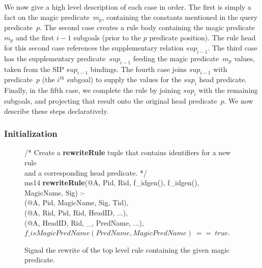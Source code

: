 
We now give a high level description of each case in order.  The first is
simply a fact on the magic predicate~$m_p$, containing the constants mentioned
in the query predicate~$p$.  The second case creates a rule body containing the
magic predicate~$m_p$ and the first $i-1$ subgoals (prior to the $p$ predicate
position).  The rule head for this second case references the supplementary
relation $sup_{i-1}$.  The third case has the supplementary
predicate~$sup_{i-1}$ feeding the magic predicate~$m_p$ values, taken from the
SIP $sup_{i-1}$ bindings.  The fourth case joins $sup_{i-1}$ with predicate~$p$
(the $i^{th}$ subgoal) to supply the values for the $sup_i$ head predicate.
Finally, in the fifth case, we complete the rule by joining $sup_i$ with the
remaining subgoals, and projecting that result onto the original head
predicate~$p$.  We now describe these steps declaratively.

\subsubsection{Initialization}

\begin{figure}[!t]
\ssp
\centering
\begin{boxedminipage}{\linewidth}
/* Create a {\bf rewriteRule} tuple that contains identifiers for a new rule \\
and a corresponding head predicate. */ \\
ms14 {\bf rewriteRule}(@A, Pid, Rid, f\_idgen(), f\_idgen(), MagicName, Sig) :- \\
(@A, Pid, MagicName, Sig, Tid), \\
(@A, Rid, Pid, Rid, HeadID, ...), \\
(@A, HeadID, Rid, \_, PredName, ...), \\
\datalogspace $f\_isMagicPredName(PredName, MagicPredName)\ ==\ true$. \\
\end{boxedminipage}
\caption{\label{ch:magic:fig:rewrite1} Signal the rewrite of the top level rule 
containing the given magic predicate.}
\end{figure}

